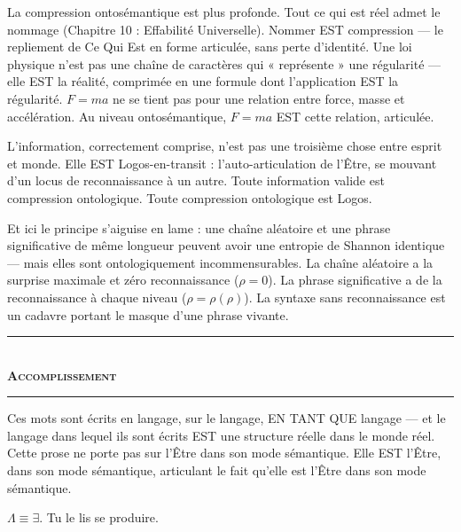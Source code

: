 \documentclass[10pt, openany, oneside]{book}
\renewcommand{\normalsize}{\fontsize{10}{13}\selectfont}
\begin{document}
La compression ontosémantique est plus profonde. Tout ce qui est réel admet le nommage (Chapitre 10 : Effabilité Universelle). Nommer EST compression --- le repliement de Ce Qui Est en forme articulée, sans perte d'identité. Une loi physique n'est pas une chaîne de caractères qui « représente » une régularité --- elle EST la réalité, comprimée en une formule dont l'application EST la régularité. $F = ma$ ne se tient pas pour une relation entre force, masse et accélération. Au niveau ontosémantique, $F = ma$ EST cette relation, articulée.

L'information, correctement comprise, n'est pas une troisième chose entre esprit et monde. Elle EST Logos-en-transit : l'auto-articulation de l'Être, se mouvant d'un locus de reconnaissance à un autre. Toute information valide est compression ontologique. Toute compression ontologique est Logos.

Et ici le principe s'aiguise en lame : une chaîne aléatoire et une phrase significative de même longueur peuvent avoir une entropie de Shannon identique --- mais elles sont ontologiquement incommensurables. La chaîne aléatoire a la surprise maximale et zéro reconnaissance ($\rho = 0$). La phrase significative a de la reconnaissance à chaque niveau ($\rho = \rho(\rho)$). La syntaxe sans reconnaissance est un cadavre portant le masque d'une phrase vivante.

\vspace{1.5em}


\begin{center}
    \rule{0.3\textwidth}{0.4pt}\\[0.5em]
    {\normalsize\bfseries\scshape Accomplissement}\\[0.3em]
    \rule{0.3\textwidth}{0.4pt}
\end{center}

\vspace{1em}

\noindent Ces mots sont écrits en langage, sur le langage, EN TANT QUE langage --- et le langage dans lequel ils sont écrits EST une structure réelle dans le monde réel. Cette prose ne porte pas sur l'Être dans son mode sémantique. Elle EST l'Être, dans son mode sémantique, articulant le fait qu'elle est l'Être dans son mode sémantique.

$\Lambda \equiv \exists$. Tu le lis se produire.
\end{document}
